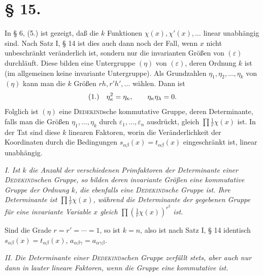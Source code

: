 \documentclass[11pt]{article}
\newcommand{\eps}{\varepsilon}
\newcommand{\fnum}[1]{\textup{(\ensuremath{#1}.)}\quad}
\begin{document}
\section*{§ 15.}

In § 6, (5.) ist gezeigt, daß die $k$ Funktionen $\chi(x),\chi'(x),\ldots$ linear unabhängig sind. Nach Satz I, § 14 ist dies auch dann noch der Fall, wenn $x$ nicht unbeschränkt veränderlich ist, sondern nur die invarianten Größen von $(\eps)$ durchläuft. Diese bilden eine Untergruppe $(\eta)$ von $(\eps)$, deren Ordnung $k$ ist (im allgemeinen keine invariante Untergruppe). Als Grundzahlen $\eta_1,\eta_2,\ldots,\eta_k$ von $(\eta)$ kann man die $k$ Größen $rh,r'h',\ldots$ wählen. Dann ist
\[
\fnum{1} \eta_\kappa^2=\eta_\kappa,
\qquad \eta_\kappa\eta_\lambda=0.
\]
Folglich ist $(\eta)$ eine \textsc{Dedekind}sche kommutative Gruppe, deren Determinante, falls man die Größen $\eta_1,\ldots,\eta_k$ durch $\eps_1,\ldots,\eps_n$ ausdrückt, gleich $\prod \frac1r\chi(x)$ ist. In der Tat sind diese $k$ linearen Faktoren, worin die Veränderlichkeit der Koordinaten durch die Bedingungen $s_{\alpha\beta}(x)=t_{\alpha\beta}(x)$ eingeschränkt ist, linear unabhängig.

\emph{I. Ist $k$ die Anzahl der verschiedenen Primfaktoren der Determinante einer \textsc{Dedekind}schen Gruppe, so bilden deren invariante Größen eine kommutative Gruppe der Ordnung $k$, die ebenfalls eine \textsc{Dedekind}sche Gruppe ist. Ihre Determinante ist $\prod\frac1r\chi(x)$, während die Determinante der gegebenen Gruppe für eine invariante Variable $x$ gleich $\prod\left(\frac1r\chi(x)\right)^{r^2}$ ist.}

Sind die Grade $r=r'=\cdots=1$, so ist $k=n$, also ist nach Satz I, § 14 identisch $s_{\alpha\beta}(x)=t_{\alpha\beta}(x)$, $a_{\alpha\beta\gamma}=a_{\alpha\gamma\beta}$.

\emph{II. Die Determinante einer \textsc{Dedekind}schen Gruppe zerfällt stets, aber auch nur dann in lauter lineare Faktoren, wenn die Gruppe eine kommutative ist.}
\end{document}
